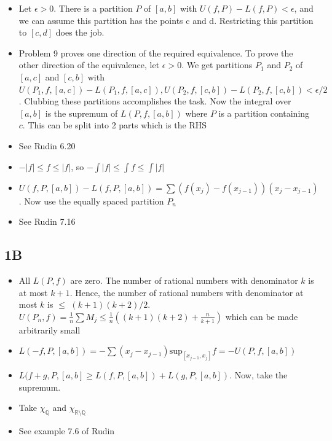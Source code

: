 \documentclass{article}
\begin{document}
\begin{itemize}
    \item[9]
    Let $\epsilon > 0$. There is a partition $P$ of $[a,b]$ with $U(f,P)-L(f,P) < \epsilon$, and we can assume this partition has the points c and d. Restricting this partition to $[c,d]$ does the job.
    \item[10]
    Problem 9 proves one direction of the required equivalence. To prove the other direction of the equivalence, let $\epsilon > 0$. We get partitions $P_1$ and $P_2$ of $[a,c]$ and $[c,b]$ with $U(P_1,f,[a,c])-L(P_1,f,[a,c]),U(P_2,f,[c,b])-L(P_2,f,[c,b]) < \epsilon/2$. Clubbing these partitions accomplishes the task. Now the integral over $[a,b]$ is the supremum of $L(P,f,[a,b])$ where $P$ is a partition containing $c$. This can be split into 2 parts which is the RHS
    \item[11] See Rudin 6.20
    \item[12]
    $-|f|\leq f \leq |f|$, so $-\int |f|\leq \int f \leq \int |f|$
    \item[13]
    $U(f,P,[a,b])-L(f,P,[a,b])= \sum(f(x_j)-f(x_{j-1}))(x_j-x_{j-1})$. Now use the equally spaced partition $P_n$
    \item[14]
    See Rudin 7.16
    
    
    
\end{itemize}

\subsection*{1B}

\begin{itemize}
    \item[1] 
    All $L(P,f)$ are zero. The number of rational numbers with denominator $k$ is at most $k+1$. Hence, the number of rational numbers with denominator at most $k$ is $\leq$ $(k+1)(k+2)/2$. $U(P_n,f)= \frac{1}{n}\sum M_j \leq \frac{1}{n}((k+1)(k+2) + \frac{n}{k+1})$ which can be made arbitrarily small
    \item[2]
    $L(-f,P,[a,b])=- \sum (x_j-x_{j-1}) \text{sup}_{[x_{j-1},x_j]} f= -U(P,f,[a,b])$
    \item [3]
    $L(f+g,P,[a,b]\geq L(f,P,[a,b])+L(g,P,[a,b])$. Now, take the supremum.
    \item[4]
    Take $\chi_\mathbb{Q}$ and $\chi_{\mathbb{R} \setminus \mathbb{Q}}$
    \item[5]
    See example 7.6 of Rudin
\end{itemize}
\end{document}
